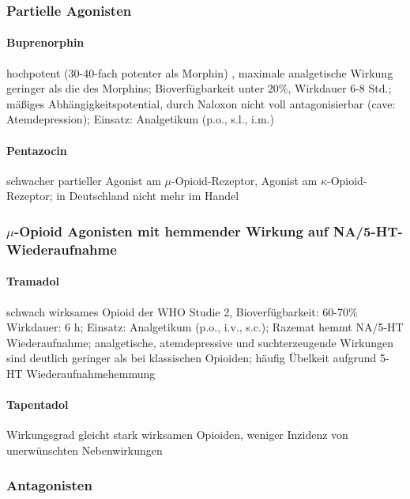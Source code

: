 \documentclass[10pt,a4paper]{report}
\begin{document}
\subsubsection{Partielle Agonisten} %
\label{par:partielle_agonisten}
\paragraph{Buprenorphin} %
\label{subp:buprenorphin}
hochpotent (30-40-fach potenter als Morphin) , maximale analgetische Wirkung geringer als die des Morphins; Bioverfügbarkeit unter 20\%, Wirkdauer 6-8 Std.; mäßiges Abhängigkeitspotential, durch Naloxon nicht voll antagonisierbar (cave: Atemdepression); Einsatz: Analgetikum (p.o., s.l., i.m.)
\paragraph{Pentazocin} %
\label{subp:pentazocin}
 schwacher partieller Agonist am $\mu$-Opioid-Rezeptor, Agonist am $\kappa$-Opioid-Rezeptor; in Deutschland nicht mehr im Handel
\subsubsection{$\mu$-Opioid Agonisten mit hemmender Wirkung auf NA/5-HT-Wiederaufnahme} %
\label{par:_opioid_agonisten_mit_hemmender_wirkung_auf_na_5_ht_wiederaufnahme}
\paragraph{Tramadol} %
\label{subp:tramadol}
schwach wirksames Opioid der WHO Studie 2, Bioverfügbarkeit: 60-70\% Wirkdauer: 6 h; Einsatz: Analgetikum (p.o., i.v., s.c.); Razemat hemmt NA/5-HT Wiederaufnahme; analgetische, atemdepressive und suchterzeugende Wirkungen sind deutlich geringer als bei klassischen Opioiden; häufig Übelkeit aufgrund 5-HT Wiederaufnahmehemmung 
\paragraph{Tapentadol} %
\label{subp:tapentadol}
Wirkungsgrad gleicht stark wirksamen Opioiden, weniger Inzidenz von unerwünschten Nebenwirkungen
\subsubsection{Antagonisten} %
\label{par:antagonisten}
\end{document}
